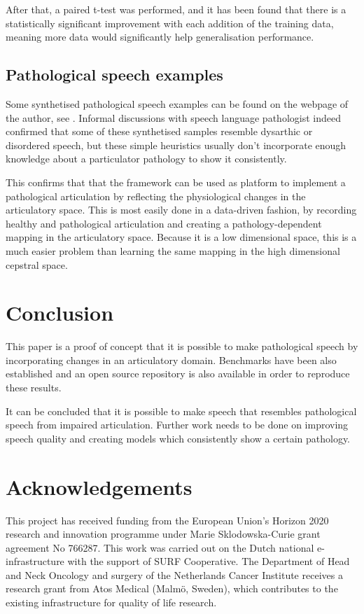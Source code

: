 \documentclass[a4paper]{article}
\begin{document}
After that, a paired t-test was performed, and it has been found that there is
a statistically significant improvement with each addition of the training data,
meaning more data would significantly help generalisation performance.

\subsection{Pathological speech examples}

Some synthetised pathological speech examples can be found on the webpage of the
author, see \cite{Speech2019}.
Informal discussions with speech language pathologist indeed confirmed
that some of these synthetised samples resemble dysarthic or disordered speech,
but these simple heuristics usually don't incorporate enough knowledge
about a particulator pathology to show it consistently.

This confirms that that the framework can be used as platform to implement a
pathological articulation by reflecting the physiological changes in the articulatory
space. This is most easily done in a data-driven fashion, by recording healthy
and pathological articulation and creating a pathology-dependent mapping
in the articulatory space. Because it is a low dimensional space, this
is a much easier problem than learning the same mapping in the high dimensional cepstral space.

\section{Conclusion}

This paper is a proof of concept that it is possible to make pathological
speech by incorporating changes in an articulatory domain. Benchmarks
have been also established and an open source repository is also available
in order to reproduce these results. 

It can be concluded that it is possible to make speech that resembles
pathological speech from impaired articulation. Further work needs to be done on improving
speech quality and creating models which consistently show a certain
pathology.

\section{Acknowledgements}
This project has received funding from the European Union's Horizon
2020 research and innovation programme under Marie Sklodowska-Curie
grant agreement No 766287.
This work was carried out on the Dutch national e-infrastructure with the support of SURF Cooperative.
The Department of Head and Neck Oncology and surgery of the Netherlands
Cancer Institute receives a research grant from Atos Medical (Malmö,
Sweden), which contributes to the existing infrastructure for quality of
life research.




\end{document}
